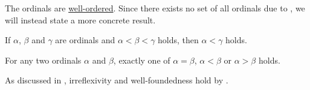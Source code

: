 \begin{proposition}\label{thm:ordinals_are_well_ordered}
  The ordinals are \hyperref[def:well_ordered_set]{well-ordered}. Since there exists no set of all ordinals due to , we will instead state a more concrete result.

  \begin{thmenum}
     If \( \alpha \), \( \beta \) and \( \gamma \) are ordinals and \( \alpha < \beta < \gamma \) holds, then \( \alpha < \gamma \) holds.

     For any two ordinals \( \alpha \) and \( \beta \), exactly one of \( \alpha = \beta \), \( \alpha < \beta \) or \( \alpha > \beta \) holds.
  \end{thmenum}

  As discussed in , irreflexivity and well-foundedness hold by .
\end{proposition}
